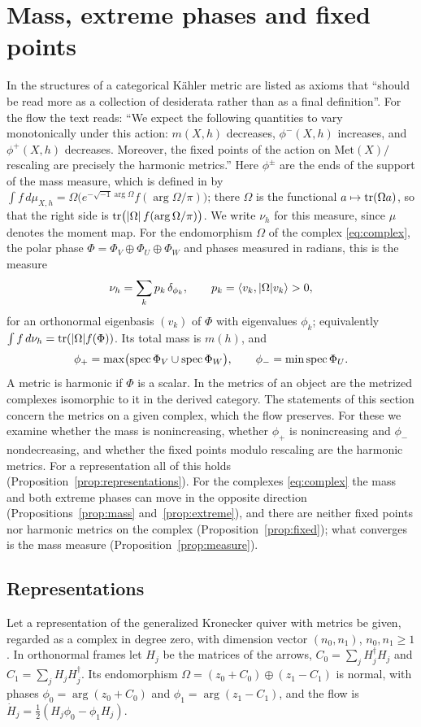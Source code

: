 \section{Mass, extreme phases and fixed points}\label{sec:expectations}

In \cite[\S4.1]{hkkp26} the structures of a categorical K\"ahler metric are
listed as axioms that ``should be read more as a collection of desiderata
rather than as a final definition''. For the flow the text reads: ``We expect
the following quantities to vary monotonically under this action: $m(X,h)$
decreases, $\phi^-(X,h)$ increases, and $\phi^+(X,h)$ decreases. Moreover,
the fixed points of the action on $\mathrm{Met}(X)/$rescaling are precisely
the harmonic metrics.'' Here $\phi^\pm$ are the ends of the support of the
mass measure, which is defined in \cite[\S4.2]{hkkp26} by
$\int f\,d\mu_{X,h}=\Omega\bigl(e^{-\sqrt{-1}\arg\Omega}f(\arg\Omega/\pi)\bigr)$;
there $\Omega$ is the functional $a\mapsto\operatorname{tr}(\Omega a)$, so that the right
side is $\operatorname{tr}\bigl(|\Omega|\,f(\arg\Omega/\pi)\bigr)$. We write $\nu_h$ for this
measure, since $\mu$ denotes the moment map. For
the endomorphism $\Omega$ of the complex \eqref{eq:complex}, the polar phase
$\Phi=\Phi_V\oplus\Phi_U\oplus\Phi_W$ and phases measured in radians, this is
the measure
\[
 \nu_h=\sum_kp_k\,\delta_{\phi_k},\qquad p_k=\left\langle v_k,|\Omega|v_k\right\rangle>0,
\]
for an orthonormal eigenbasis $(v_k)$ of $\Phi$ with eigenvalues $\phi_k$;
equivalently $\int f\,d\nu_h=\operatorname{tr}(|\Omega|f(\Phi))$. Its total mass is $m(h)$,
and
\[
 \phi_+=\max\bigl(\operatorname{spec}\Phi_V\cup\operatorname{spec}\Phi_W\bigr),\qquad
 \phi_-=\min\operatorname{spec}\Phi_U .
\]
A metric is harmonic if $\Phi$ is a scalar. In \cite[Remark~5.15]{hkkp26} the
metrics of an object are the metrized complexes isomorphic to it in the
derived category. The statements of this section concern the metrics on a
given complex, which the flow preserves. For these we examine whether the
mass is nonincreasing, whether $\phi_+$ is nonincreasing and $\phi_-$
nondecreasing, and whether the fixed points modulo rescaling are the harmonic
metrics. For a representation all of this holds
(Proposition~\ref{prop:representations}). For the complexes
\eqref{eq:complex} the mass and both extreme phases can move in the opposite
direction (Propositions~\ref{prop:mass} and~\ref{prop:extreme}), and there
are neither fixed points nor harmonic metrics on the complex
(Proposition~\ref{prop:fixed}); what converges is the mass measure
(Proposition~\ref{prop:measure}).

\subsection{Representations}
Let a representation of the generalized Kronecker quiver with metrics be
given, regarded as a complex in degree zero, with dimension vector
$(n_0,n_1)$, $n_0,n_1\geq1$. In orthonormal frames let $H_j$ be the matrices
of the arrows, $C_0=\sum_jH_j^\dagger H_j$ and $C_1=\sum_jH_jH_j^\dagger$. Its
endomorphism $\Omega=(z_0+C_0)\oplus(z_1-C_1)$ is normal, with phases
$\phi_0=\arg(z_0+C_0)$ and $\phi_1=\arg(z_1-C_1)$, and the flow is
$\dot H_j=\frac12(H_j\phi_0-\phi_1H_j)$.

